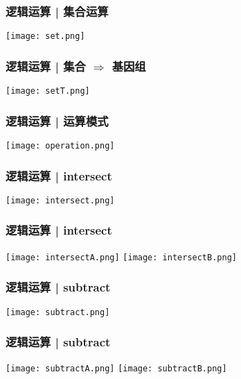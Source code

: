 \begin{frame}
  \frametitle{逻辑运算 | 集合运算}
    \begin{center}
      \texttt{[image: set.png]}
    \end{center}
\end{frame}

\begin{frame}
  \frametitle{逻辑运算 | 集合 $\Rightarrow$ 基因组}
    \begin{center}
      \texttt{[image: setT.png]}
    \end{center}
\end{frame}

\begin{frame}
  \frametitle{逻辑运算 | \alert{运算模式}}
    \begin{center}
      \texttt{[image: operation.png]}
    \end{center}
\end{frame}

\begin{frame}
  \frametitle{逻辑运算 | intersect}
    \begin{center}
      \texttt{[image: intersect.png]}
    \end{center}
\end{frame}

\begin{frame}
  \frametitle{逻辑运算 | intersect}
    \begin{center}
      \texttt{[image: intersectA.png]}
      \vspace{0.5cm}
      \texttt{[image: intersectB.png]}
    \end{center}
\end{frame}

\begin{frame}
  \frametitle{逻辑运算 | subtract}
    \begin{center}
      \texttt{[image: subtract.png]}
    \end{center}
\end{frame}

\begin{frame}
  \frametitle{逻辑运算 | subtract}
    \begin{center}
      \texttt{[image: subtractA.png]}
      \vspace{0.5cm}
      \texttt{[image: subtractB.png]}
    \end{center}
\end{frame}

